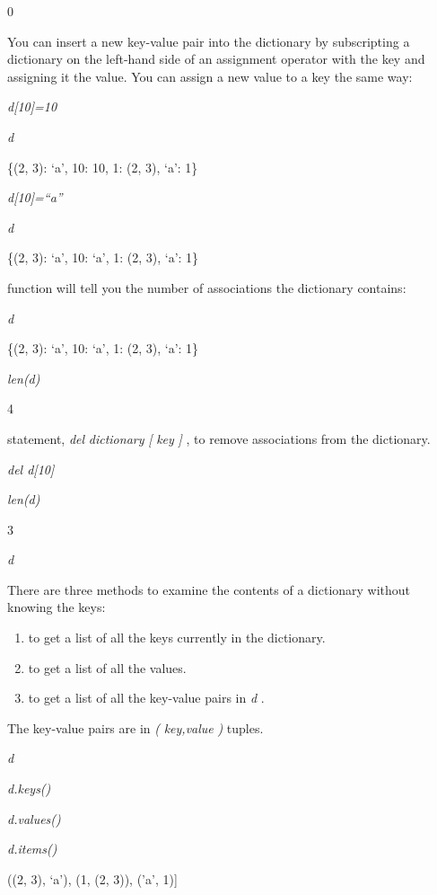 0

You can insert a new key-value pair
into the dictionary by subscripting a dictionary on the left-hand side
of an assignment operator with the key and assigning it the value. You
can assign a new value to a key the same way:


\emph{d{[}10{]}=10}


\emph{d}

\{(2, 3): `a', 10: 10, 1: (2, 3),
`a': 1\}


\emph{d{[}10{]}=``a''}


\emph{d}

\{(2, 3): `a', 10: `a', 1: (2, 3),
`a': 1\}

 function will tell
you the number of associations the dictionary contains:


\emph{d}

\{(2, 3): `a', 10: `a', 1: (2, 3),
`a': 1\}


\emph{len(d)}

4


statement, \emph{del} \emph{dictionary} \emph{{[}} \emph{key} \emph{{]}}
, to remove associations from the dictionary.


\emph{del d{[}10{]}}


\emph{len(d)}

3


\emph{d}



There are three methods to examine
the contents of a dictionary without knowing the keys:

\begin{enumerate}

\item
   to get a
  list of all the keys currently in the dictionary.
\item
   to get a
  list of all the values.
\item
   to get a
  list of all the key-value pairs in \emph{d} .
\end{enumerate}

The key-value pairs are in
\emph{(} \emph{key,value} \emph{)} tuples.


\emph{d}




\emph{d.keys()}




\emph{d.values()}




\emph{d.items()}

((2, 3), `a'), (1, (2, 3)),
('a', 1){]}

